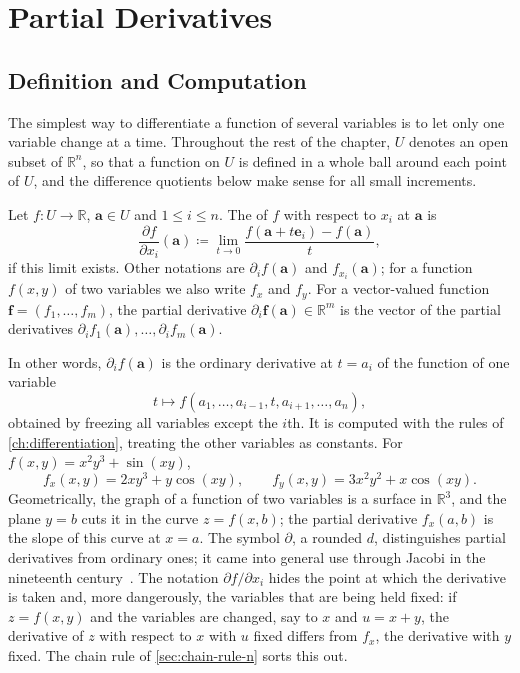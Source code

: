\section{Partial Derivatives}
\label{sec:partial-derivatives}

\subsection{Definition and Computation}

The simplest way to differentiate a function of several variables is to let only one variable change at a time. Throughout the rest of the chapter, $U$ denotes an open subset of $\mathbb R^n$, so that a function on $U$ is defined in a whole ball around each point of $U$, and the difference quotients below make sense for all small increments.

\begin{definition}
\label{def:partial-derivative}
Let $f\colon U\to\mathbb R$, $\mathbf a\in U$ and $1\le i\le n$. The  of $f$ with respect to $x_i$ at $\mathbf a$ is
\[
\frac{\partial f}{\partial x_i}(\mathbf a)\coloneqq\lim_{t\to0}\frac{f(\mathbf a+t\mathbf e_i)-f(\mathbf a)}t ,
\]
if this limit exists. Other notations are $\partial_if(\mathbf a)$ and $f_{x_i}(\mathbf a)$; for a function $f(x,y)$ of two variables we also write $f_x$ and $f_y$. For a vector-valued function $\mathbf f=(f_1,\ldots,f_m)$, the partial derivative $\partial_i\mathbf f(\mathbf a)\in\mathbb R^m$ is the vector of the partial derivatives $\partial_if_1(\mathbf a),\ldots,\partial_if_m(\mathbf a)$.
\end{definition}

In other words, $\partial_if(\mathbf a)$ is the ordinary derivative at $t=a_i$ of the function of one variable
\[
t\mapsto f(a_1,\ldots,a_{i-1},t,a_{i+1},\ldots,a_n),
\]
obtained by freezing all variables except the $i$th. It is computed with the rules of \cref{ch:differentiation}, treating the other variables as constants. For $f(x,y)=x^2y^3+\sin(xy)$,
\[
f_x(x,y)=2xy^3+y\cos(xy),\qquad f_y(x,y)=3x^2y^2+x\cos(xy).
\]
Geometrically, the graph of a function of two variables is a surface in $\mathbb R^3$, and the plane $y=b$ cuts it in the curve $z=f(x,b)$; the partial derivative $f_x(a,b)$ is the slope of this curve at $x=a$. The symbol $\partial$, a rounded $d$, distinguishes partial derivatives from ordinary ones; it came into general use through Jacobi in the nineteenth century~\cite{jacobi1841}. The notation $\partial f/\partial x_i$ hides the point at which the derivative is taken and, more dangerously, the variables that are being held fixed: if $z=f(x,y)$ and the variables are changed, say to $x$ and $u=x+y$, the derivative of $z$ with respect to $x$ with $u$ fixed differs from $f_x$, the derivative with $y$ fixed. The chain rule of \cref{sec:chain-rule-n} sorts this out.

